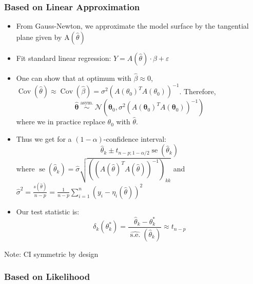\documentclass[11pt, %
	oneside, %
	english, %
	onehalfspacing, %
	]{article} %
\numberwithin{equation}{section}
\begin{document}
\subsubsection*{Based on Linear Approximation}

\begin{itemize}
	\item From Gauss-Newton, we approximate the model surface by the tangential plane given by $\mathrm{A}(\hat{\theta})$
	\item Fit standard linear regression: $Y=A(\hat{\theta}) \cdot \beta+\varepsilon$
	\item One can show that at optimum with $\hat{\beta} \approx 0$,   $\operatorname{Cov}(\hat{\theta}) \approx \operatorname{Cov}(\hat{\beta})=\sigma^2\left(A\left(\theta_0\right)^T A\left(\theta_0\right)\right)^{-1}$. Therefore,
	$$
    \widehat{\mathbf{\theta}} \stackrel{\text { asym. }}{\sim} \mathcal{N}\left(\mathbf{\theta}_0, \sigma^2\left(A\left(\mathbf{\theta}_0\right)^T A\left(\mathbf{\theta}_0\right)\right)^{-1}\right)
    $$
    where we in practice replace $\theta_0$ with $\hat{\theta}$.
	\item Thus we get for a $(1-\alpha)$-confidence interval:
	\begin{equation*}
        \widehat{\theta}_k \pm t_{n-p ; 1-\alpha / 2} \operatorname{se}\left(\widehat{\theta}_k\right)
    \end{equation*}
    where $\operatorname{se}\left(\widehat{\theta}_k\right)=\widehat{\sigma} \sqrt{\left(\left(A(\widehat{\theta})^T A(\widehat{\theta})\right)^{-1}\right)_{k k}}$ and $\hat{\sigma}^2=\frac{s(\widehat{\theta})}{n-p}=\frac{1}{n-p} \sum_{i=1}^n\left(y_i-\eta_i(\widehat{\theta})\right)^2$
    \item Our test statistic is:
    \begin{equation}\label{eq.linapproxt}
        \delta_k(\theta^*_k) = \frac{\hat{\theta}_k - \theta^*_k}{\hat{\operatorname{s.e.}}(\hat{\theta}_k)} \approx t_{n-p}
    \end{equation}
\end{itemize}

Note: CI symmetric by design

\subsubsection*{Based on Likelihood}
\end{document}
